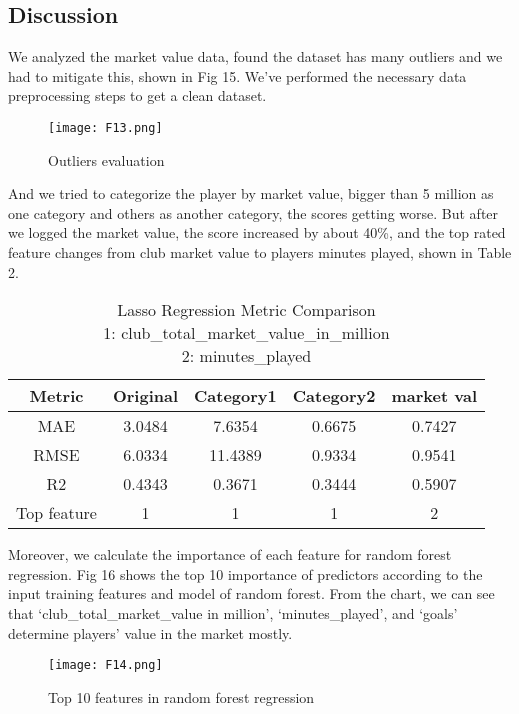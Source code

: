 \documentclass[conference]{IEEEtran}
\begin{document}
\subsection{Discussion}
We analyzed the market value data, found the dataset has many outliers and we had to mitigate this, shown in Fig 15. We’ve performed the necessary data preprocessing steps to get a clean dataset.

\begin{figure}[ht]
\begin{center}
\centerline{\texttt{[image: F13.png]}}
\caption{Outliers evaluation}
\label{bayespic}
\end{center}
\end{figure}
And we tried to categorize the player by market value, bigger than 5 million as one category and others as another category, the scores getting worse. But after we logged the market value, the score increased by about 40\%, and the top rated feature changes from club market value to players minutes played, shown in Table 2.

\begin{table}[h]
\small
\begin{center}
\begin{tabular}{|c|c|c|c|c|}
\hline \bf Metric  & \bf Original & \bf Category1 & \bf Category2 & \bf market val  \\ \hline
MAE & 3.0484 & 7.6354 & 0.6675 & 0.7427 \\ \hline
RMSE & 6.0334 & 11.4389 & 0.9334 & 0.9541 \\ \hline
R2 & 0.4343 & 0.3671 & 0.3444 & 0.5907 \\ \hline
Top feature & 1& 1& 1& 2 \\
\hline
\end{tabular}
\end{center}
\caption{\label{fontsizes} Lasso Regression Metric Comparison \\
1: club\_total\_market\_value\_in\_million \\
2: minutes\_played}
\end{table}

Moreover, we calculate the importance of each feature for random forest regression. Fig 16 shows the top 10 importance of predictors according to the input training features and model of random forest. From the chart, we can see that ‘club\_total\_market\_value in million’, ‘minutes\_played’, and ‘goals’ determine players’ value in the market mostly. 
\begin{figure}[ht]
\begin{center}
\centerline{\texttt{[image: F14.png]}}
\caption{Top 10 features in random forest regression}
\label{bayespic}
\end{center}
\end{figure}
\end{document}

